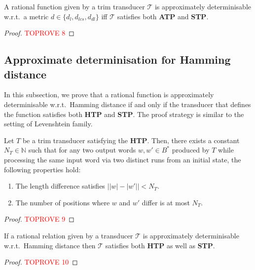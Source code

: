 \documentclass[a4paper,UKenglish,cleveref, autoref, thm-restate,authorcolumns, colorlinks]{lipics-v2021}
\newcommand\calT{\mathcal{T}}
\newcommand{\ATP}[0]{\textbf{ATP}}
\newcommand{\STP}[0]{\textbf{STP}}
\newcommand{\HTP}[0]{\textbf{HTP}}
\begin{document}
{\begin{lemma}\label{theorem:approxdetlev}

    A rational function given by a trim transducer $\calT$ is approximately determinisable w.r.t.~a metric $d \in \{d_l,d_{lcs},d_{dl}\}$ iff $\calT$ satisfies both \ATP{} and \STP{}.
\end{lemma}

\begin{proof}\textcolor{red}{TOPROVE 8}\end{proof}

\subsection{Approximate determinisation for Hamming distance}\label{subsec:ham}
In this subsection, we prove that a rational function is approximately determinisable w.r.t.~Hamming distance if and only if the transducer that defines the function satisfies both \HTP{} and \STP{}. The proof strategy is similar to the setting of Levenshtein family.
    \begin{lemma}\label{claim:HP}
    Let $T$ be a trim transducer satisfying the \HTP{}. Then, there exists a constant $N_T \in \mathbb{N}$ such that for any two output words $w, w' \in B^*$ produced by $T$ while processing the same input word via two distinct runs from an initial state, the following properties hold:
    \begin{enumerate}
        \item\label{item:sameLength} The length difference satisfies $\big||w| - |w'|\big| < N_T$.
        \item\label{item:mismatch} The number of positions where $w$ and $w'$ differ is at most $N_T$.
    \end{enumerate}
    \end{lemma}


    \begin{proof}\textcolor{red}{TOPROVE 9}\end{proof}


\begin{proposition}\label{proposition:approxtoHTPSTP}
   If a rational relation given by a transducer $\calT$
   is approximately determinisable w.r.t.~Hamming distance
   then $\calT$ satisfies both \HTP{} as well as \STP{}.
\end{proposition}
\begin{proof}\textcolor{red}{TOPROVE 10}\end{proof}


}
\end{document}
